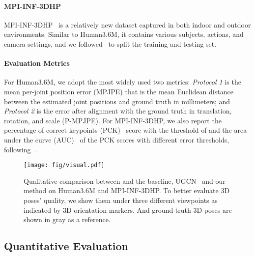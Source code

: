 \documentclass[sigconf]{acmart}
\begin{document}
\vspace{-2mm}
\paragraph{MPI-INF-3DHP}
MPI-INF-3DHP~\cite{mehta2017monocular} is a relatively new dataset captured in both indoor and outdoor environments.
Similar to Human3.6M, it contains various subjects, actions, and camera settings, and
we followed~\cite{mehta2017vnect,wang2020motion,lin2019trajectory} to split the training and testing set.

\vspace{-2mm}
\paragraph{Evaluation Metrics}
For Human3.6M, we adopt the most widely used two metrics: \emph{Protocol 1} is the mean per-joint position error (MPJPE) that is the mean Euclidean distance between the estimated joint positions and ground truth in millimeters; and \emph{Protocol 2} is the error after alignment with the ground truth in translation, rotation, and scale (P-MPJPE).
For MPI-INF-3DHP, we also report the percentage of correct keypoints (PCK)~\cite{mehta2017monocular} score with the threshold of  and the area under the curve (AUC)~\cite{mehta2017monocular} of the PCK scores with different error thresholds, following~\cite{lin2019trajectory,wang2020motion,mehta2017monocular,mehta2017vnect}.







\begin{figure*}[!t] 
	\centering
	\texttt{[image: fig/visual.pdf]}
	\vspace{-3mm}
	\caption{
		Qualitative comparison between and the baseline, \textcolor{UGCN}{UGCN}~\cite{wang2020motion} and \textcolor{OURS}{our method} on Human3.6M and MPI-INF-3DHP.
		To better evaluate 3D poses' quality, we show them under three different viewpoints as indicated by 3D orientation markers.
		And ground-truth 3D poses are shown in \textcolor{GT}{gray} as a reference.
	}
	\vspace{-3mm}
	\label{fig: visual}
\end{figure*} 





\vspace{-1mm}
\subsection{Quantitative Evaluation}
\end{document}
